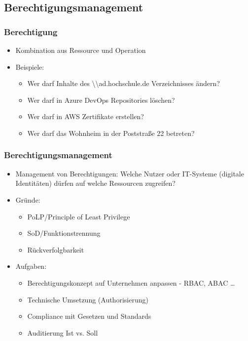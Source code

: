 \documentclass[11pt]{beamer}
\begin{document}
\subsection{Berechtigungsmanagement}
\begin{frame}
  \frametitle{Berechtigung}
  \begin{itemize}
    \item Kombination aus Ressource und Operation~
    \item Beispiele:
          \begin{itemize}
            \item Wer darf Inhalte des \textbackslash{}\textbackslash{}ad.hochschule.de Verzeichnisses ändern?
            \item Wer darf in Azure DevOps Repositories löschen?
            \item Wer darf in AWS Zertifikate erstellen?
            \item Wer darf das Wohnheim in der Poststraße 22 betreten?
          \end{itemize}
  \end{itemize}
\end{frame}

\begin{frame}
  \frametitle{Berechtigungsmanagement}
  \begin{itemize}
    \item Management von Berechtigungen: Welche Nutzer oder IT-Systeme (digitale Identitäten) dürfen auf welche Ressourcen zugreifen?
    \item Gründe:
          \begin{itemize}
            \item PoLP/Principle of Least Privilege
            \item SoD/Funktionstrennung
            \item Rückverfolgbarkeit
          \end{itemize}
    \item Aufgaben:
          \begin{itemize}
            \item Berechtigungskonzept auf Unternehmen anpassen - RBAC, ABAC \ldots
            \item Technische Umsetzung (Authorisierung)
            \item Compliance mit Gesetzen und Standards
            \item Auditierung Ist vs. Soll
          \end{itemize}
  \end{itemize}
\end{frame}
\end{document}
